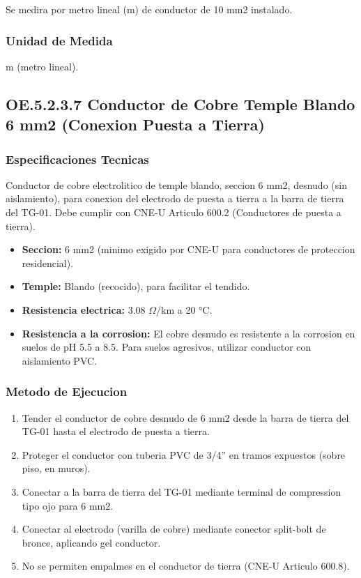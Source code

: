 Se medira por metro lineal (m) de conductor de 10 mm2 instalado.

\subsubsection{Unidad de Medida}

m (metro lineal).

\subsection{OE.5.2.3.7 Conductor de Cobre Temple Blando 6 mm2 (Conexion Puesta a Tierra)}

\subsubsection{Especificaciones Tecnicas}

Conductor de cobre electrolitico de temple blando, seccion 6 mm2, desnudo (sin aislamiento), para conexion del electrodo de puesta a tierra a la barra de tierra del TG-01. Debe cumplir con CNE-U Articulo 600.2 (Conductores de puesta a tierra).

\begin{itemize}[nosep]
  \item \textbf{Seccion:} 6 mm2 (minimo exigido por CNE-U para conductores de proteccion residencial).
  \item \textbf{Temple:} Blando (recocido), para facilitar el tendido.
  \item \textbf{Resistencia electrica:} 3.08 $\Omega$/km a 20 °C.
  \item \textbf{Resistencia a la corrosion:} El cobre desnudo es resistente a la corrosion en suelos de pH 5.5 a 8.5. Para suelos agresivos, utilizar conductor con aislamiento PVC.
\end{itemize}

\subsubsection{Metodo de Ejecucion}

\begin{enumerate}
  \item Tender el conductor de cobre desnudo de 6 mm2 desde la barra de tierra del TG-01 hasta el electrodo de puesta a tierra.
  \item Proteger el conductor con tuberia PVC de 3/4'' en tramos expuestos (sobre piso, en muros).
  \item Conectar a la barra de tierra del TG-01 mediante terminal de compression tipo ojo para 6 mm2.
  \item Conectar al electrodo (varilla de cobre) mediante conector split-bolt de bronce, aplicando gel conductor.
  \item No se permiten empalmes en el conductor de tierra (CNE-U Articulo 600.8).
\end{enumerate}

